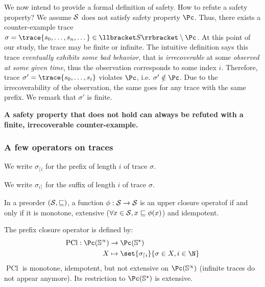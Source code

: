 \documentclass[toc]{../cs-classes/cs-classes}
\DeclareMathOperator{\pcl}{PCl}
\begin{document}
We now intend to provide a formal definition of safety. How to refute a safety property? We assume $\mathcal{S}$ does not satisfy safety property $\Pc$. Thus, there exists a counter-example trace $\sigma=\trace{s_0, \dots, s_n, \dots}\in \llbracket S \rrbracket \setminus \Pc$. At this point of our study, the trace may be finite or infinite. The intuitive definition says this trace \emph{eventually exhibits some bad behavior}, that is \emph{irrecoverable} at some \emph{observed at some given time}, thus the observation corresponds to some index $i$. Therefore, trace $\sigma' = \trace{s_0, \dots, s_i}$ violates $\Pc$, i.e. $\sigma'\notin\Pc$. Due to the irrecoverability of the observation, the same goes for any trace with the same prefix. We remark that $\sigma'$ is finite.
\begin{center}
    \bf A safety property that does not hold can always be refuted with a finite, irrecoverable counter-example.
\end{center}

\subsubsection{A few operators on traces}
\begin{definition}[Prefix]
    We write $\sigma_{\lceil i}$ for the prefix of length $i$ of trace $\sigma$.
\end{definition}

\begin{definition}
    We write $\sigma_{i \rceil}$ for the suffix of length $i$ of trace $\sigma$.
\end{definition}

\begin{definition}[Upper closure operators ($\pcl$)]
    In a preorder $(\mathcal{S}, \sqsubseteq)$, a function $\phi : \mathcal{S} \to \mathcal{S}$ is an upper closure operatof if and only if it is monotone, extensive ($\forall x\in \mathcal{S}, x\sqsubseteq \phi(x)$) and idempotent.
\end{definition}

\begin{definition}
    The prefix closure operator is defined by:
    \begin{equation*}
        \begin{aligned}
            \pcl : \Pc(\S^\propto) &\to \Pc(\S^\star)\\
            X &\mapsto \set{\sigma_{\lceil i}}{\sigma\in X, i\in \N}
        \end{aligned}
    \end{equation*}
    $\pcl$ is monotone, idempotent, but not extensive on $\Pc(\S^\propto)$ (infinite traces do not appear anymore). Its restriction to $\Pc(\S^\star)$ is extensive.
\end{definition}
\end{document}
